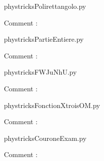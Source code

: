 
    \newcommand{\CaptionFigPolirettangolo}{<+Type your caption here+>}
    \begin{center}
        
    \end{center}
    phystricksPolirettangolo.py

    Comment : 

    \clearpage
    


    \newcommand{\CaptionFigPartieEntiere}{<+Type your caption here+>}
    \begin{center}
        
    \end{center}
    phystricksPartieEntiere.py

    Comment : 

    \clearpage
    


    \newcommand{\CaptionFigFWJuNhU}{<+Type your caption here+>}
    \begin{center}
        
    \end{center}
    phystricksFWJuNhU.py

    Comment : 

    \clearpage
    


    \newcommand{\CaptionFigFonctionXtroisOM}{<+Type your caption here+>}
    \begin{center}
        
    \end{center}
    phystricksFonctionXtroisOM.py

    Comment : 

    \clearpage
    


    \newcommand{\CaptionFigCouroneExam}{<+Type your caption here+>}
    \begin{center}
        
    \end{center}
    phystricksCouroneExam.py

    Comment : 

    \clearpage
    


